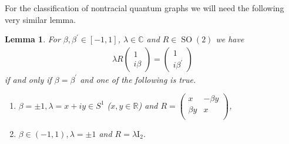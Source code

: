 \documentclass{amsart}
\newtheorem{lemma}[thm]{Lemma}
\newcommand{\R}{\mathbb{R}}
\newcommand{\C}{\mathbb{C}}
\DeclareMathOperator{\SO}{SO}
\begin{document}
For the classification of nontracial quantum graphs we will need the following very similar lemma.

\begin{lemma}
    \label{lin::lemma:uniqueness_of_lambda_in_C2}
    For $\beta, \beta^\prime \in [-1,1]$, $\lambda \in \C$ and $R \in \SO(2)$ we have
    \begin{align}
    \label{dir::eq:beta_beta_prime_are_index_of_the_same_line_in_C2}
        \lambda R \begin{pmatrix}
            1 \\ i \beta
        \end{pmatrix}
        = \begin{pmatrix}
            1 \\ i \beta^\prime
        \end{pmatrix}
    \end{align}
    if and only if $\beta = \beta^\prime$ and one of the following is true.
    \begin{enumerate}[label=(\alph*)]
        \item\label{lin::item:beta_beta_prime_are_index_of_the_same_line_in_C2:a} $\beta = \pm 1, \lambda = x + iy \in S^1$ ($x, y \in \R$) and $\displaystyle R = \begin{pmatrix}
            x & -\beta y \\
            \beta y & x \\
        \end{pmatrix}$,
        \item\label{lin::item:beta_beta_prime_are_index_of_the_same_line_in_C2:b} $\beta \in (-1,1), \lambda = \pm 1$ and $\displaystyle R = \lambda \mathrm{I}_2$.
    \end{enumerate}
\end{lemma}
\end{document}
